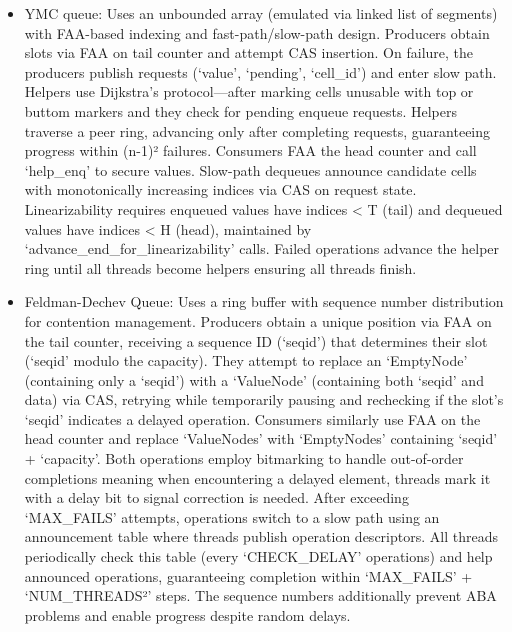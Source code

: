 \begin{itemize}
   \item YMC queue: Uses an unbounded array (emulated via linked list of segments) with \ac{FAA}-based indexing and fast-path/slow-path design. Producers obtain slots via \ac{FAA} on tail counter and attempt \ac{CAS} insertion. On failure, the producers publish requests (\enquote*{value}, \enquote*{pending}, \enquote*{cell\_id}) and enter slow path. Helpers use Dijkstra's protocol—after marking cells unusable with top or buttom markers and they check for pending enqueue requests. Helpers traverse a peer ring, advancing only after completing requests, guaranteeing progress within (n-1)² failures. Consumers \ac{FAA} the head counter and call \enquote*{help\_enq} to secure values. Slow-path dequeues announce candidate cells with monotonically increasing indices via \ac{CAS} on request state. Linearizability requires enqueued values have indices < T (tail) and dequeued values have indices < H (head), maintained by \enquote*{advance\_end\_for\_linearizability} calls. Failed operations advance the helper ring until all threads become helpers ensuring all threads finish. \cite{FastFetchAndAddWaitFreeQueue}
   \item Feldman-Dechev Queue: Uses a ring buffer with sequence number distribution for contention management. Producers obtain a unique position via \ac{FAA} on the tail counter, receiving a sequence ID (\enquote*{seqid}) that determines their slot (\enquote*{seqid} modulo the capacity). They attempt to replace an \enquote*{EmptyNode} (containing only a \enquote*{seqid}) with a \enquote*{ValueNode} (containing both \enquote*{seqid} and data) via \ac{CAS}, retrying while temporarily pausing and rechecking if the slot's \enquote*{seqid} indicates a delayed operation. Consumers similarly use \ac{FAA} on the head counter and replace \enquote*{ValueNodes} with \enquote*{EmptyNodes} containing \enquote*{seqid} + \enquote*{capacity}. Both operations employ bitmarking to handle out-of-order completions meaning when encountering a delayed element, threads mark it with a delay bit to signal correction is needed. After exceeding \enquote*{MAX\_FAILS} attempts, operations switch to a slow path using an announcement table where threads publish operation descriptors. All threads periodically check this table (every \enquote*{CHECK\_DELAY} operations) and help announced operations, guaranteeing completion within \enquote*{MAX\_FAILS} + \enquote*{NUM\_THREADS²} steps. The sequence numbers additionally prevent ABA problems and enable progress despite random delays. \cite{FeldmanDechev2015WaitFreeRingBuffer,FeldmanDechevV2,FeldmanDechevV3}

\end{itemize}
